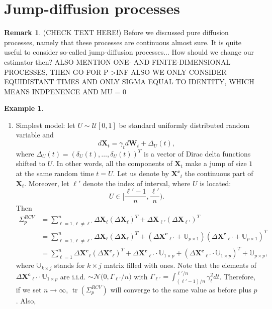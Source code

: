 \documentclass[a4paper,11pt]{article}
\theoremstyle{plain}
\theoremstyle{definition}
\newtheorem{exmp}[thm]{Example}
\newtheorem{rmrk}[thm]{Remark}
\newcommand{\tr}{\operatorname{tr}}
\begin{document}
    \section*{Jump-diffusion processes}
    \begin{rmrk}
    	(CHECK TEXT HERE!)
    	Before we discussed pure diffusion processes, namely that these processes are continuous almost sure. It is quite useful to consider so-called jump-diffusion processes... How should we change our estimator then?
    	ALSO MENTION ONE- AND FINITE-DIMENSIONAL PROCESSES, THEN GO FOR P->INF
    	ALSO WE ONLY CONSIDER EQUIDISTANT TIMES
	    AND ONLY SIGMA EQUAL TO IDENTITY, WHICH MEANS INDPENENCE
	    AND MU = 0
    \end{rmrk}
    
    \begin{exmp} \label{uniform jumps} \
    	\begin{enumerate}
    	\item Simplest model: let $U \sim \mathcal{U}[0, 1]$ be standard uniformly distributed random variable and
    	\begin{equation}
    	d\mathbf{X}_t = \gamma_t  d\mathbf{W}_t + \Delta_U(t),
    	\end{equation}
    	where $\Delta_U(t) = (\delta_U(t), \dots, \delta_U(t))^T$ is a vector of Dirac delta functions shifted to $U$. In other words, all the components of $\mathbf{X}_t$ make a jump of size $1$ at the same random time $t = U$. Let us denote by $\mathbf{X^c}_t$ the continuous part of $\mathbf{X}_t$. Moreover, let $\ell'$ denote the index of interval, where $U$ is located:
    	\[ U \in \bigg[\frac{\ell'-1}{n}, \frac{\ell'}{n}\bigg). \]
    	Then
    	\[ 
    	\begin{aligned}
    	\Sigma_p^{RCV} & = \sum_{\ell=1, \ell \neq \ell'}^{n}\Delta \mathbf{X}_\ell(\Delta \mathbf{X}_\ell)^T + \Delta \mathbf{X}_{\ell'}(\Delta \mathbf{X}_{\ell'})^T\\
    	 & = \sum_{\ell=1, \ell \neq \ell'}^{n}\Delta \mathbf{X}_\ell(\Delta \mathbf{X}_\ell)^T + (\Delta \mathbf{X^c}_{\ell'} + \mathbb{U}_{p \times 1})(\Delta \mathbf{X^c}_{\ell'} + \mathbb{U}_{p \times 1})^T\\
    	& =  \sum_{\ell=1}^{n}\Delta \mathbf{X^c}_\ell(\Delta \mathbf{X^c}_\ell)^T + \Delta \mathbf{X^c}_{\ell'} \cdot \mathbb{U}_{1 \times p} + (\Delta \mathbf{X^c}_{\ell'} \cdot \mathbb{U}_{1 \times p})^T + \mathbb{U}_{p \times p} ,
    	\end{aligned}
    	\]
    	where $\mathbb{U}_{k \times j}$ stands for $k \times j$ matrix filled with ones. Note that the elements of $\Delta \mathbf{X^c}_{\ell'} \cdot \mathbb{U}_{1 \times p}$ are i.i.d. $ \sim \mathcal{N}\big(0, \Gamma_{\ell'}/n )$ with $\Gamma_{\ell'}=\int_{(\ell' - 1)/n}^{\ell' / n} \gamma_t^2 dt$. Therefore, if we set $n \rightarrow \infty$, $\tr(\Sigma_p^{RCV})$ will converge to the same value as before plus $p$. Also,

\end{enumerate}
\end{exmp}
\end{document}
